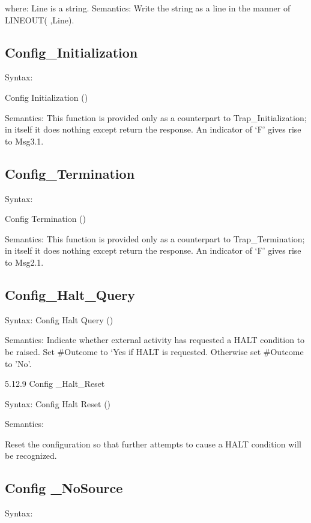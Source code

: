 where: Line is a string. Semantics: Write the string as a line in the
manner of LINEOUT( ,Line).

\hypertarget{config_initialization}{%
\subsection{Config\_Initialization}\label{config_initialization}}

Syntax:

Config Initialization ()

Semantics: This function is provided only as a counterpart to
Trap\_Initialization; in itself it does nothing except return the
response. An indicator of `F' gives rise to Msg3.1.

\hypertarget{config_termination}{%
\subsection{Config\_Termination}\label{config_termination}}

Syntax:

Config Termination ()

Semantics: This function is provided only as a counterpart to
Trap\_Termination; in itself it does nothing except return the response.
An indicator of `F' gives rise to Msg2.1.

\hypertarget{config_halt_query}{%
\subsection{Config\_Halt\_Query}\label{config_halt_query}}

Syntax: Config Halt Query ()

Semantics: Indicate whether external activity has requested a HALT
condition to be raised. Set \#Outcome to `Yes if HALT is requested.
Otherwise set \#Outcome to 'No'.

5.12.9 Config \_Halt\_Reset

Syntax: Config Halt Reset ()

Semantics:

Reset the configuration so that further attempts to cause a HALT
condition will be recognized.

\hypertarget{config-_nosource}{%
\subsection{Config \_NoSource}\label{config-_nosource}}

Syntax:

